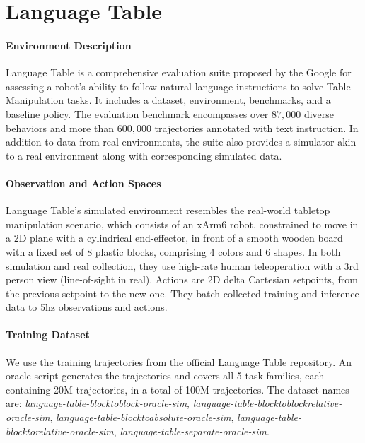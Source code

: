 \section{Language Table} \label{appendix:language-table}

\paragraph{Environment Description} Language Table \citep{language_table} is a comprehensive evaluation suite proposed by the Google for assessing a robot's ability to follow natural language instructions to solve Table Manipulation tasks. It includes a dataset, environment, benchmarks, and a baseline policy. The evaluation benchmark encompasses over $87,000$ diverse behaviors and more than $600,000$ trajectories annotated with text instruction. In addition to data from real environments, the suite also provides a simulator akin to a real environment along with corresponding simulated data. 

\paragraph{Observation and Action Spaces} Language Table’s simulated environment resembles the real-world tabletop manipulation scenario, which consists of an xArm6 robot, constrained to move in a 2D plane with a cylindrical end-effector, in front of a smooth wooden board with a fixed set of 8 plastic blocks, comprising 4 colors and 6 shapes. In both simulation and real collection, they use high-rate human teleoperation with a 3rd
person view (line-of-sight in real). Actions are 2D delta Cartesian
setpoints, from the previous setpoint to the new one. They batch collected training and inference data to 5hz observations and actions. 

\paragraph{Training Dataset} We use the training trajectories from the official Language Table repository. An oracle script generates the trajectories and covers all 5 task families, each containing 20M trajectories, in a total of 100M trajectories. The dataset names are: \textit{language-table-blocktoblock-oracle-sim}, \textit{language-table-blocktoblockrelative-oracle-sim}, \textit{language-table-blocktoabsolute-oracle-sim}, \textit{language-table-blocktorelative-oracle-sim}, \textit{language-table-separate-oracle-sim}. 

